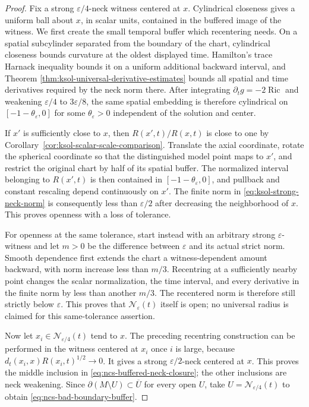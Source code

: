 \documentclass[10pt]{coll-l}
\theoremstyle{definition}
\theoremstyle{remark}
\numberwithin{section}{chapter}
\numberwithin{equation}{chapter}
\newcommand{\Ric}{\operatorname{Ric}}
\begin{document}
\begin{proof}
Fix a strong $\varepsilon/4$-neck witness centered at $x$.  Cylindrical
closeness gives a uniform ball about $x$, in scalar units, contained in the
buffered image of the witness.  We first create the small temporal buffer
which recentering needs.  On a spatial subcylinder separated from the
boundary of the chart, cylindrical closeness bounds curvature at the
oldest displayed time.  Hamilton's trace Harnack inequality bounds it on a
uniform additional backward interval, and Theorem
\ref{thm:ksol-universal-derivative-estimates} bounds all spatial and time
derivatives required by the neck norm there.  After integrating
$\partial_tg=-2\Ric$ and weakening $\varepsilon/4$ to
$3\varepsilon/8$, the same spatial embedding is therefore cylindrical on
$[-1-\theta_\varepsilon,0]$ for some
$\theta_\varepsilon>0$ independent of the solution and center.

If $x'$ is sufficiently close to $x$, then $R(x',t)/R(x,t)$ is close to
one by Corollary~\ref{cor:ksol-scalar-scale-comparison}.  Translate the
axial coordinate, rotate the spherical coordinate so that the
distinguished model point maps to $x'$, and restrict the original chart by
half of its spatial buffer.  The normalized interval belonging to
$R(x',t)$ is then contained in $[-1-\theta_\varepsilon,0]$, and pullback
and constant rescaling depend continuously on $x'$.  The finite norm in
\eqref{eq:ksol-strong-neck-norm} is consequently less than
$\varepsilon/2$ after decreasing the neighborhood of $x$.  This proves
openness with a loss of tolerance.

For openness at the same tolerance, start instead with an arbitrary strong
$\varepsilon$-witness and let $m>0$ be the difference between
$\varepsilon$ and its actual strict norm.  Smooth dependence first extends
the chart a witness-dependent amount backward, with norm increase less
than $m/3$.  Recentring at a sufficiently nearby point changes the scalar
normalization, the time interval, and every derivative in the finite norm
by less than another $m/3$.  The recentered norm is therefore still
strictly below $\varepsilon$.  This proves that
$\mathscr N_\varepsilon(t)$ itself is open; no universal radius is claimed
for this same-tolerance assertion.

Now let $x_i\in\mathscr N_{\varepsilon/4}(t)$ tend to $x$.  The preceding
recentring construction can be performed in the witness centered at $x_i$
once $i$ is large, because $d_t(x_i,x)R(x_i,t)^{1/2}\to0$.  It gives a
strong $\varepsilon/2$-neck centered at $x$.  This proves the middle
inclusion in \eqref{eq:ncs-buffered-neck-closure}; the other inclusions are
neck weakening.  Since
$\partial(M\setminus U)\subset\overline U$ for every open $U$, take
$U=\mathscr N_{\varepsilon/4}(t)$ to obtain
\eqref{eq:ncs-bad-boundary-buffer}.
\end{proof}
\end{document}
